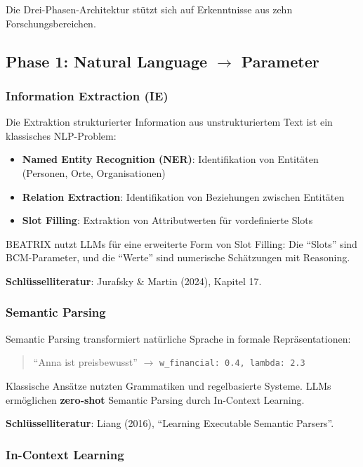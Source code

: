 \documentclass[12pt,a4paper]{article}
\begin{document}
Die Drei-Phasen-Architektur stützt sich auf Erkenntnisse aus zehn Forschungsbereichen.

\subsection{Phase 1: Natural Language $\rightarrow$ Parameter}

\subsubsection{Information Extraction (IE)}

Die Extraktion strukturierter Information aus unstrukturiertem Text ist ein klassisches NLP-Problem:

\begin{itemize}
    \item \textbf{Named Entity Recognition (NER)}: Identifikation von Entitäten (Personen, Orte, Organisationen)
    \item \textbf{Relation Extraction}: Identifikation von Beziehungen zwischen Entitäten
    \item \textbf{Slot Filling}: Extraktion von Attributwerten für vordefinierte Slots
\end{itemize}

BEATRIX nutzt LLMs für eine erweiterte Form von Slot Filling: Die ``Slots'' sind BCM-Parameter, und die ``Werte'' sind numerische Schätzungen mit Reasoning.

\textbf{Schlüsselliteratur}: Jurafsky \& Martin (2024), Kapitel 17.

\subsubsection{Semantic Parsing}

Semantic Parsing transformiert natürliche Sprache in formale Repräsentationen:

\begin{quote}
``Anna ist preisbewusst'' $\rightarrow$ \texttt{w\_financial: 0.4, lambda: 2.3}
\end{quote}

Klassische Ansätze nutzten Grammatiken und regelbasierte Systeme.
LLMs ermöglichen \textbf{zero-shot} Semantic Parsing durch In-Context Learning.

\textbf{Schlüsselliteratur}: Liang (2016), ``Learning Executable Semantic Parsers''.

\subsubsection{In-Context Learning}
\end{document}
